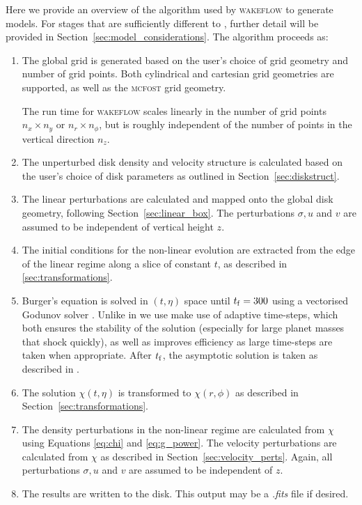 Here we provide an overview of the algorithm used by \textsc{wakeflow} to generate models.
For stages that are sufficiently different to \citet{bollati2021}, further detail will be provided in Section~\ref{sec:model_considerations}.
The algorithm proceeds as:
\begin{enumerate}
    \item The global grid is generated based on the user's choice of grid geometry and number of grid points. Both cylindrical and cartesian grid geometries are supported, as well as the \textsc{mcfost} grid geometry.
    
    The run time for \textsc{wakeflow} scales linearly in the number of grid points $n_x \times n_y$ or $n_r \times n_\phi$, but is roughly independent of the number of points in the vertical direction $n_z$.
    
    \item The unperturbed disk density and velocity structure is calculated based on the user's choice of disk parameters as outlined in Section~\ref{sec:diskstruct}.
    
    \item The linear perturbations are calculated and mapped onto the global disk geometry, following Section~\ref{sec:linear_box}. The perturbations $\sigma, u$ and $v$ are assumed to be independent of vertical height $z$.
    
    \item The initial conditions for the non-linear evolution are extracted from the edge of the linear regime along a slice of constant $t$, as described in \ref{sec:transformations}.
    
    \item Burger's equation is solved in $(t,\eta)$ space until $t_{\rm f}=300$ using a vectorised Godunov solver \citep{astrofluids}. Unlike in \citet{bollati2021} we use make use of adaptive time-steps, which both ensures the stability of the solution (especially for large planet masses that shock quickly), as well as improves efficiency as large time-steps are taken when appropriate. After $t_{\rm f}$, the asymptotic solution is taken as described in \citet{bollati2021}.
    
    \item The solution $\chi(t,\eta)$ is transformed to $\chi(r,\phi)$ as described in Section~\ref{sec:transformations}.
    
    \item The density perturbations in the non-linear regime are calculated from $\chi$ using Equations \eqref{eq:chi} and \eqref{eq:g_power}. The velocity perturbations are calculated from $\chi$ as described in Section~\ref{sec:velocity_perts}. Again, all perturbations $\sigma, u$ and $v$ are assumed to be independent of $z$.
    
    \item The results are written to the disk. This output may be a \textit{.fits} file if desired.
\end{enumerate}

